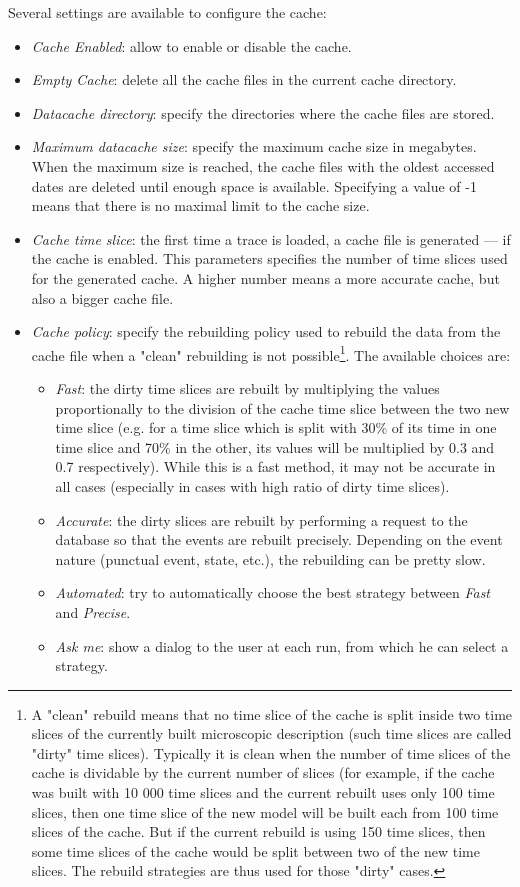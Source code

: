 \documentclass[twoside]{article}
\begin{document}
\begin{sloppypar}
Several settings are available to configure the cache:
\begin{itemize}
	\item \textit{Cache Enabled}: allow to enable or disable the cache.
	\item \textit{Empty Cache}: delete all the cache files in the current cache directory.
	\item \textit{Datacache directory}: specify the directories where the cache files are stored.
	\item \textit{Maximum datacache size}: specify the maximum cache size in megabytes. When the maximum size is reached, the cache files with the oldest accessed dates are deleted until enough space is available. Specifying a value of -1 means that there is no maximal limit to the cache size.
	\item \textit{Cache time slice}: the first time a trace is loaded, a cache file is generated --- if the cache is enabled. This parameters specifies the number of time slices used for the generated cache. A higher number means a more accurate cache, but also a bigger cache file.
	\item \textit{Cache policy}: specify the rebuilding policy used to rebuild the data from the cache file when a "clean" rebuilding is not possible\footnote{A "clean" rebuild means that no time slice of the cache is split inside two time slices of the currently built microscopic description (such time slices are called "dirty" time slices). Typically it is clean when the number of time slices of the cache is dividable by the current number of slices (for example, if the cache was built with 10 000 time slices and the current rebuilt uses only 100 time slices, then one time slice of the new model will be built each from 100 time slices of the cache. But if the current rebuild is using 150 time slices, then some time slices of the cache would be split between two of the new time slices. The rebuild strategies are thus used for those "dirty" cases.}. The available choices are:
	\begin{itemize}
		\item \textit{Fast}: the dirty time slices are rebuilt by multiplying the values proportionally to the division of the cache time slice between the two new time slice (e.g. for a time slice which is split with 30\% of its time in one time slice and 70\% in the other, its values will be multiplied by 0.3 and 0.7 respectively). While this is a fast method, it may not be accurate in all cases (especially in cases with high ratio of dirty time slices).
		\item \textit{Accurate}: the dirty slices are rebuilt by performing a request to the database so that the events are rebuilt precisely. Depending on the event nature (punctual event, state, etc.), the rebuilding can be pretty slow.
		\item \textit{Automated}: try to automatically choose the best strategy between \textit{Fast} and \textit{Precise}. 
		\item \textit{Ask me}: show a dialog to the user at each run, from which he can select a strategy.
	\end{itemize}   
\end{itemize} 


\end{sloppypar}
\end{document}
